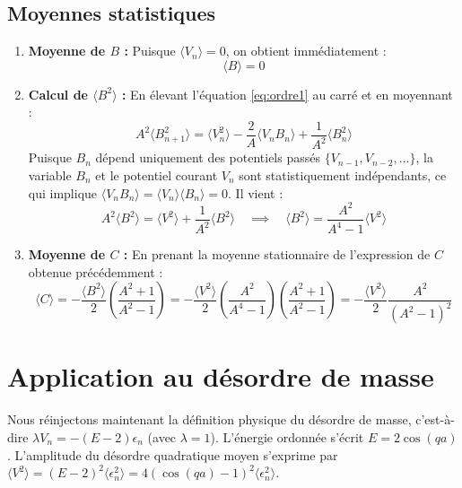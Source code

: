\subsection{Moyennes statistiques}
\begin{enumerate}
    \item \textbf{Moyenne de $B$ :}
    Puisque $\langle V_n \rangle = 0$, on obtient immédiatement :
    \begin{equation}
        \langle B \rangle = 0
    \end{equation}
    
    \item \textbf{Calcul de $\langle B^2 \rangle$ :}
    En élevant l'équation \eqref{eq:ordre1} au carré et en moyennant :
    \begin{equation}
        A^2 \langle B_{n+1}^2 \rangle = \langle V_n^2 \rangle - \frac{2}{A}\langle V_n B_n \rangle + \frac{1}{A^2}\langle B_n^2 \rangle
    \end{equation}
    Puisque $B_n$ dépend uniquement des potentiels passés $\{V_{n-1}, V_{n-2}, \dots\}$, la variable $B_n$ et le potentiel courant $V_n$ sont statistiquement indépendants, ce qui implique $\langle V_n B_n \rangle = \langle V_n \rangle\langle B_n \rangle = 0$. Il vient :
    \begin{equation}
        A^2 \langle B^2 \rangle = \langle V^2 \rangle + \frac{1}{A^2}\langle B^2 \rangle \quad \implies \quad \langle B^2 \rangle = \frac{A^2}{A^4 - 1}\langle V^2 \rangle
    \end{equation}
    
    \item \textbf{Moyenne de $C$ :}
    En prenant la moyenne stationnaire de l'expression de $C$ obtenue précédemment :
    \begin{equation}
        \langle C \rangle = -\frac{\langle B^2 \rangle}{2} \left( \frac{A^2 + 1}{A^2 - 1} \right) = -\frac{\langle V^2 \rangle}{2} \left( \frac{A^2}{A^4 - 1} \right) \left( \frac{A^2 + 1}{A^2 - 1} \right) = -\frac{\langle V^2 \rangle}{2} \frac{A^2}{(A^2 - 1)^2}
    \end{equation}
\end{enumerate}

\section{Application au désordre de masse}

Nous réinjectons maintenant la définition physique du désordre de masse, c'est-à-dire $\lambda V_n = -(E - 2)\epsilon_n$ (avec $\lambda=1$).
L'énergie ordonnée s'écrit $E = 2\cos(qa)$. L'amplitude du désordre quadratique moyen s'exprime par $\langle V^2 \rangle = (E - 2)^2 \langle \epsilon_n^2 \rangle = 4(\cos(qa) - 1)^2 \langle \epsilon_n^2 \rangle$.

